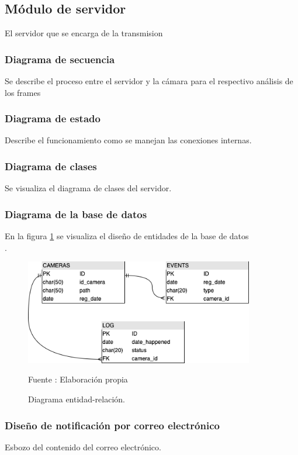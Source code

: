 \subsection{Módulo de servidor}
El servidor que se encarga de la transmision
\subsubsection{Diagrama de secuencia}
Se describe el proceso entre el servidor y la cámara para el respectivo análisis de los frames
\subsubsection{Diagrama de estado}
Describe el funcionamiento como se manejan las conexiones internas.

\subsubsection{Diagrama de clases}
Se visualiza el diagrama de clases del servidor.
\subsubsection{Diagrama de la base de datos}
En la figura \ref{fig:db_diagram} se visualiza el diseño de entidades de la base de datos\\.
\begin{figure}[H]
    \begin{center}
        \includegraphics[width=10cm]{img/capitulo_4/db.png}
    \end{center}
    \begin{center}
        \caption{Diagrama entidad-relación.}
        Fuente : Elaboración propia
        \label{fig:db_diagram}
    \end{center}
\end{figure}

\subsubsection{Diseño de notificación por correo electrónico}
Esbozo del contenido del correo electrónico.